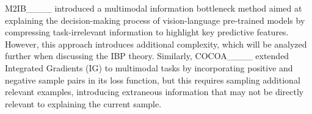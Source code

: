 \begin{table}[htpb]
\centering
\caption{Comparison of interpretability methods based on several criteria: whether they require no extra examples, no randomness, need no specific structure, avoid information loss, explain the current model, and don't rely on downstream tasks.}
\label{tab.comp}
\end{table}


M2IB____ introduced a multimodal information bottleneck method aimed at explaining the decision-making process of vision-language pre-trained models by compressing task-irrelevant information to highlight key predictive features. However, this approach introduces additional complexity, which will be analyzed further when discussing the IBP theory. Similarly, COCOA____ extended Integrated Gradients (IG) to multimodal tasks by incorporating positive and negative sample pairs in its loss function, but this requires sampling additional relevant examples, introducing extraneous information that may not be directly relevant to explaining the current sample.

